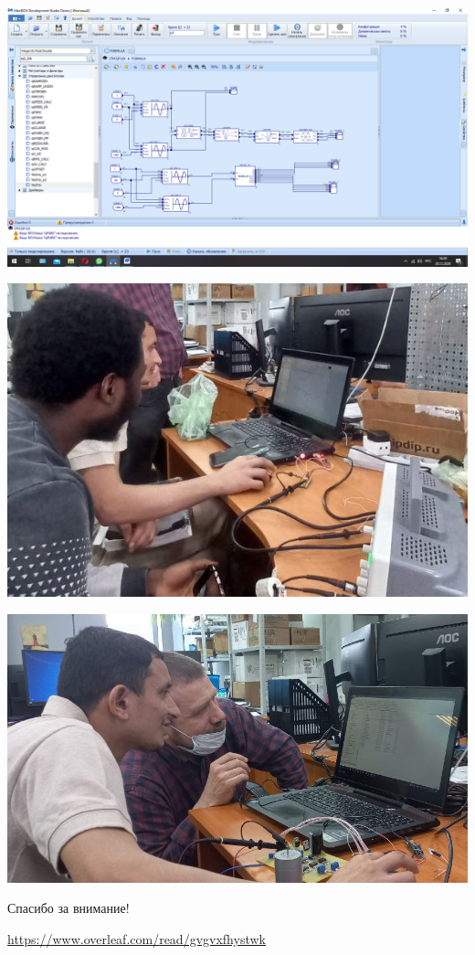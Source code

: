 \begin{frame}
\hspace{-1.5cm}
\includegraphics[width=1.3\linewidth]{standart.png} 
\end{frame}

\begin{frame}
\hspace{-1cm}
\includegraphics[width=1.1\linewidth]{students.jpg}
\end{frame}

\begin{frame}
\hspace{-1cm}
\includegraphics[width=1.1\linewidth]{students1.jpg}
\end{frame}



\begin{frame}
\centering
Спасибо за внимание!
\vspace{1cm}

\url{https://www.overleaf.com/read/gvgvxfhystwk}

\end{frame}






